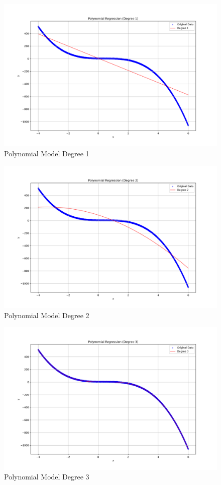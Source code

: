 \documentclass[11pt]{article}
\begin{document}
\begin{figure}[h!]
  \includegraphics[width=\textwidth]{../plots/poly_reg_deg1_fold1.png}
  \centering
  \caption{Polynomial Model Degree 1}
\end{figure}

\begin{figure}[h!]
  \includegraphics[width=\textwidth]{../plots/poly_reg_deg2_fold1.png}
  \centering
  \caption{Polynomial Model Degree 2}
\end{figure}

\begin{figure}[h!]
  \includegraphics[width=\textwidth]{../plots/poly_reg_deg3_fold1.png}
  \centering
  \caption{Polynomial Model Degree 3}
\end{figure}
\end{document}
